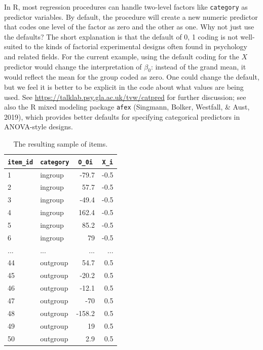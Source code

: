 \documentclass[
  english,
  doc,floatsintext]{apa6}
\begin{document}
In R, most regression procedures can handle two-level factors like \texttt{category} as predictor variables. By default, the procedure will create a new numeric predictor that codes one level of the factor as zero and the other as one. Why not just use the defaults? The short explanation is that the default of 0, 1 coding is not well-suited to the kinds of factorial experimental designs often found in psychology and related fields. For the current example, using the default coding for the \(X\) predictor would change the interpretation of \(\beta_0\): instead of the grand mean, it would reflect the mean for the group coded as zero. One could change the default, but we feel it is better to be explicit in the code about what values are being used. See \url{https://talklab.psy.gla.ac.uk/tvw/catpred} for further discussion; see also the R mixed modeling package \texttt{afex} (Singmann, Bolker, Westfall, \& Aust, 2019), which provides better defaults for specifying categorical predictors in ANOVA-style designs.

\begin{table}[H]

\begin{center}
\begin{threeparttable}

\caption{\label{tab:items-table}The resulting sample of items.}

\begin{tabular}{llrr}
\toprule
\texttt{item\_id} & \multicolumn{1}{c}{\texttt{category}} & \multicolumn{1}{c}{\texttt{O\_0i}} & \multicolumn{1}{c}{\texttt{X\_i}}\\
\midrule
1 & ingroup & -79.7 & -0.5\\
2 & ingroup & 57.7 & -0.5\\
3 & ingroup & -49.4 & -0.5\\
4 & ingroup & 162.4 & -0.5\\
5 & ingroup & 85.2 & -0.5\\
6 & ingroup & 79 & -0.5\\
... & ... & ... & ...\\
44 & outgroup & 54.7 & 0.5\\
45 & outgroup & -20.2 & 0.5\\
46 & outgroup & -12.1 & 0.5\\
47 & outgroup & -70 & 0.5\\
48 & outgroup & -158.2 & 0.5\\
49 & outgroup & 19 & 0.5\\
50 & outgroup & 2.9 & 0.5\\
\bottomrule
\end{tabular}

\end{threeparttable}
\end{center}

\end{table}
\end{document}
